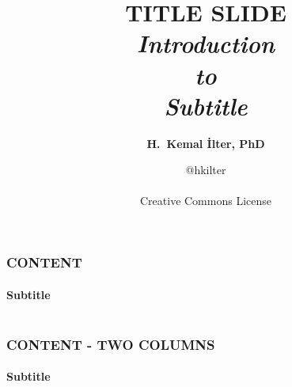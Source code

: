 \documentclass[14 pt]{beamer}
\title[Short-title]{TITLE SLIDE\\ \vskip1cm \fontspec{Crimson Text}
\textit{Introduction\\to\\Subtitle}}
\date[ilter-desc]{@hkilter\\ \vskip4cm \ccbyncnd \\ Creative Commons License}
\author[ilter]{\textbf{H.~Kemal İlter, PhD}}
\begin{document}

%
%


\begin{frame}
\titlepage
\end{frame}


\begin{frame}[t]
\frametitle{CONTENT}
\framesubtitle{Subtitle}

\begin{columns}[t]
\begin{column}{0.96\textwidth}
\lipsum[1]
\vskip0.5cm%
\lipsum[2]
\end{column}
\end{columns}
\end{frame}


\begin{frame}[t]
\frametitle{CONTENT - TWO COLUMNS}
\framesubtitle{Subtitle}
\begin{columns}[t]
\begin{column}{0.45\textwidth}
\lipsum[3]
\vskip0.5cm%
\lipsum[4]
\end{column}
\begin{column}{0.45\textwidth}
\lipsum[5]
\vskip0.5cm%
\lipsum[6]
\end{column}
\end{columns}
\end{frame}

\end{document}
